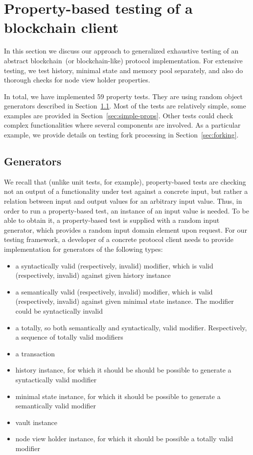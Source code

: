 
\section{Property-based testing of a blockchain client}
\label{sec:props}

In this section we discuss our approach to generalized exhaustive testing of an abstract blockchain~(or blockchain-like) protocol implementation. For extensive testing, we test history, minimal state and memory pool separately, and also do thorough checks for node view holder properties.
	
In total, we have implemented 59 property tests. They are using random object generators described in Section~\ref{sec:generators}. Most of the tests are relatively simple, some examples are provided in Section~\ref{sec:simple-props}. Other tests could check complex functionalities where several components are involved. As a particular example, we provide details on testing fork processing in Section~\ref{sec:forking}.

\subsection{Generators}
\label{sec:generators}

We recall that (unlike unit tests, for example), property-based tests are checking not an output of a functionality under test against a concrete input, but rather a relation between input and output values for an arbitrary input value. Thus, in order to run a property-based test, an instance of an input value is needed. To be able to obtain it, a property-based test is supplied with a random input generator, which provides a random input domain element upon request. For our testing framework, a developer of a concrete protocol client needs to provide implementation for generators of the following types:

\begin{itemize}
	\item{a syntactically valid (respectively, invalid) modifier, which is valid (respectively, invalid) against given history instance}
	\item{a semantically valid (respectively, invalid) modifier, which is valid (respectively, invalid) against given minimal state instance. The modifier could be syntactically invalid}
	\item{a totally, so both semantically and syntactically, valid modifier. Respectively, a sequence of totally valid modifiers}
	\item{a transaction}
	\item{history instance, for which it should be should be possible to generate a syntactically valid modifier}
	\item{minimal state instance, for which it should be possible to generate a semantically valid modifier}
	\item{vault instance}
	\item{node view holder instance, for which it should be possible a totally valid modifier}
\end{itemize}

